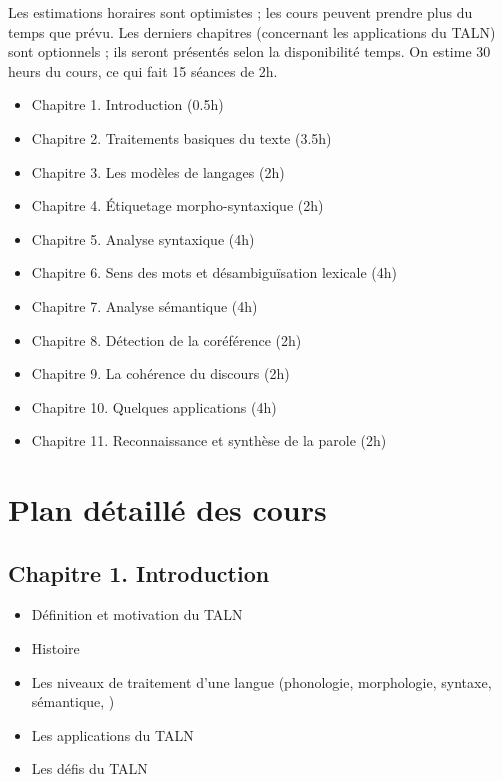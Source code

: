 \documentclass[11pt, a4paper]{article}
\newcommand\repeatstr[1]{\leavevmode\xleaders\hbox{#1}\hfill\kern0pt}
\begin{document}
Les estimations horaires sont optimistes ; les cours peuvent prendre plus du temps que prévu. 
Les derniers chapitres (concernant les applications du TALN) sont optionnels ; ils seront présentés selon la disponibilité temps. On estime 30 heurs du cours, ce qui fait 15 séances de 2h. 

\begin{itemize}
	\item Chapitre 1. Introduction (0.5h)
	\item Chapitre 2. Traitements basiques du texte (3.5h)
	\item Chapitre 3. Les modèles de langages (2h)
	\item Chapitre 4. Étiquetage morpho-syntaxique (2h)
	\item Chapitre 5. Analyse syntaxique (4h)
	\item Chapitre 6. Sens des mots et désambiguïsation lexicale (4h)
	\item Chapitre 7. Analyse sémantique (4h)
	\item Chapitre 8. Détection de la coréférence (2h)
	\item Chapitre 9. La cohérence du discours (2h)
	\item Chapitre 10. Quelques applications (4h)
	\item Chapitre 11. Reconnaissance et synthèse de la parole (2h)
\end{itemize}


\section{Plan détaillé des cours}

\begin{tcolorbox}

\subsection*{Chapitre 1. Introduction} %

\begin{multicols}{2}
\begin{itemize}
	\item Définition et motivation du TALN
	\item Histoire
	\item Les niveaux de traitement d'une langue (phonologie, morphologie, syntaxe, sémantique, )
	\item Les applications du TALN
	\item Les défis du TALN
\end{itemize}
\end{multicols}
\end{tcolorbox}
\end{document}
